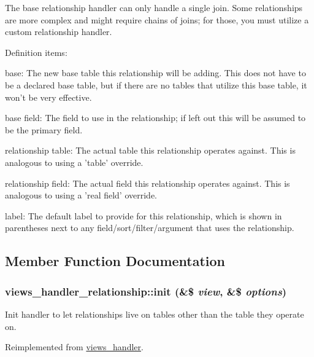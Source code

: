 The base relationship handler can only handle a single join. Some relationships are more complex and might require chains of joins; for those, you must utilize a custom relationship handler.

Definition items:
\begin{DoxyItemize}
\item base: The new base table this relationship will be adding. This does not have to be a declared base table, but if there are no tables that utilize this base table, it won't be very effective.
\item base field: The field to use in the relationship; if left out this will be assumed to be the primary field.
\item relationship table: The actual table this relationship operates against. This is analogous to using a 'table' override.
\item relationship field: The actual field this relationship operates against. This is analogous to using a 'real field' override.
\item label: The default label to provide for this relationship, which is shown in parentheses next to any field/sort/filter/argument that uses the relationship. 
\end{DoxyItemize}

\subsection{Member Function Documentation}
\hypertarget{classviews__handler__relationship_a33b2a40a9ddca4256d455137a28c4aa0}{
\subsubsection[{init}]{\setlength{\rightskip}{0pt plus 5cm}views\_\-handler\_\-relationship::init (\&\$ {\em view}, \/  \&\$ {\em options})}}
\label{classviews__handler__relationship_a33b2a40a9ddca4256d455137a28c4aa0}
Init handler to let relationships live on tables other than the table they operate on. 

Reimplemented from \hyperlink{classviews__handler_aa7df174ffa94ab095f7b9fdf154bcc30}{views\_\-handler}.

